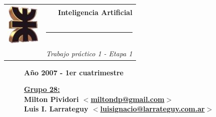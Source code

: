 \thispagestyle{empty}

\begin{center}
\begin{tabular}{cr}
\multirow{3}{*}{ \includegraphics{logoUTN.jpg} }
& \Huge\bfseries Inteligencia Artificial \\
& \noindent\rule[-1ex]{120mm}{4pt} \\
& \\
& \noindent\large\emph{Trabajo práctico 1 - Etapa 1}
\end{tabular}
\end{center}

\begin{figure}[b]
\center\large\textbf{Año 2007 - 1er cuatrimestre}
\normalsize
\linebreak
\begin{flushleft}
\bfseries
\underline{Grupo 28:}\\
Milton Pividori \href{mailto:miltondp@gmail.com}
  {$<$miltondp@gmail.com$>$}\\
Luis I. Larrateguy \href{mailto:luisignacio@larrateguy.com.ar}
  {$<$luisignacio@larrateguy.com.ar$>$}
\end{flushleft}

\end{figure}

